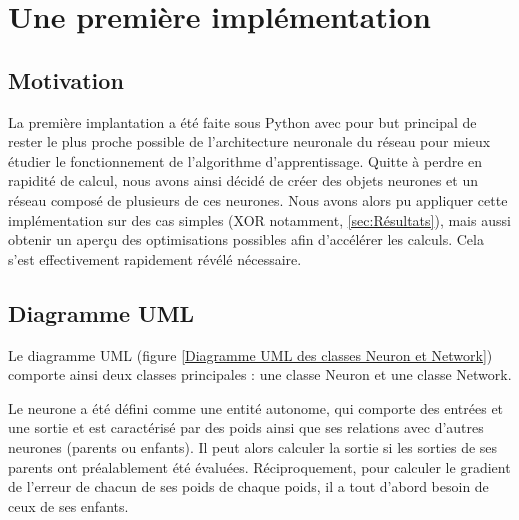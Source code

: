 \chapter{Une première implémentation}

\section{Motivation}

La première implantation a été faite sous Python avec pour but principal de rester le plus proche possible de l'architecture neuronale du réseau pour mieux étudier le fonctionnement de l'algorithme d'apprentissage. Quitte à perdre en rapidité de calcul, nous avons ainsi décidé de créer des objets neurones et un réseau composé de plusieurs de ces neurones. Nous avons alors pu appliquer cette implémentation sur des cas simples (XOR notamment, \autoref{sec:Résultats}), mais aussi obtenir un aperçu des optimisations possibles afin d'accélérer les calculs. Cela s'est effectivement rapidement révélé nécessaire.  

\section{Diagramme UML}

Le diagramme UML (figure \ref{Diagramme UML des classes Neuron et Network}) comporte ainsi deux classes principales : une classe Neuron et une classe Network. 

Le neurone a été défini comme une entité autonome, qui comporte des entrées et une sortie et est caractérisé par des poids ainsi que ses relations avec d'autres neurones (parents ou enfants). Il peut alors calculer la sortie si les sorties de ses parents ont préalablement été évaluées. Réciproquement, pour calculer le gradient de l'erreur de chacun de ses poids de chaque poids, il a tout d'abord besoin de ceux de ses enfants.


